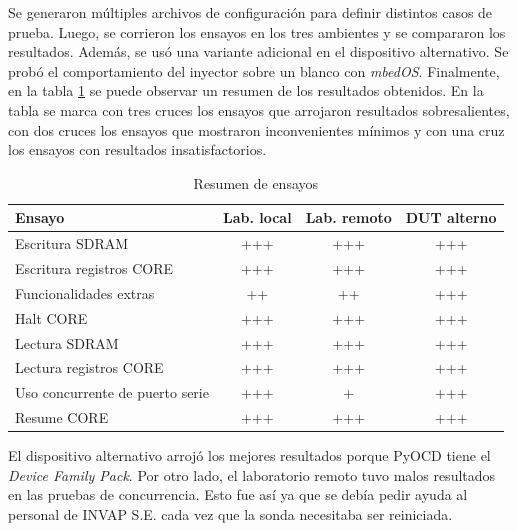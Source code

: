 Se generaron múltiples archivos de configuración para definir distintos casos de prueba.
Luego, se corrieron los ensayos en los tres ambientes y se compararon los resultados.
Además, se usó una variante adicional en el dispositivo alternativo.
Se probó el comportamiento del inyector sobre un blanco con \emph{mbedOS}.
Finalmente, en la tabla \ref{tab:resensayos} se puede observar un resumen de los resultados obtenidos.
En la tabla se marca con tres cruces los ensayos que arrojaron resultados sobresalientes, con dos cruces los ensayos que mostraron inconvenientes mínimos y con una cruz los ensayos con resultados insatisfactorios.

\begin{table}[h]
	\centering
	\caption[Resumen de ensayos]{Resumen de ensayos}

	\begin{tabular}{l c c c}    
		\toprule
        \textbf{Ensayo}                 & \textbf{Lab. local} & \textbf{Lab. remoto} & \textbf{DUT alterno} \\
		\midrule
		Escritura SDRAM                 & +++                 & +++                  & +++ \\
		Escritura registros CORE        & +++                 & +++                  & +++ \\
		Funcionalidades extras          & ++                  & ++                   & +++ \\
		Halt CORE                       & +++                 & +++                  & +++ \\
		Lectura SDRAM                   & +++                 & +++                  & +++ \\
		Lectura registros CORE          & +++                 & +++                  & +++ \\		
		Uso concurrente de puerto serie & +++                 & +                    & +++ \\
        Resume CORE                     & +++                 & +++                  & +++ \\
		\bottomrule
		\hline
	\end{tabular}
	\label{tab:resensayos}
\end{table}

El dispositivo alternativo arrojó los mejores resultados porque PyOCD tiene el \emph{Device Family Pack}.
Por otro lado, el laboratorio remoto tuvo malos resultados en las pruebas de concurrencia.
Esto fue así ya que se debía pedir ayuda al personal de INVAP S.E. cada vez que la sonda necesitaba ser reiniciada. 

